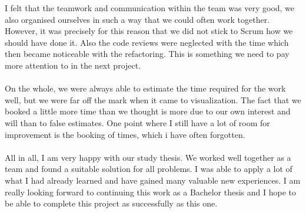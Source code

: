 I felt that the teamwork and communication within the team was very good, we also organised ourselves in such a way that we could often work together. However, it was precisely for this reason that we did not stick to Scrum how we should have done it. Also the code reviews were neglected with the time which then became noticeable with the refactoring. This is something we need to pay more attention to in the next project.
\\\\
On the whole, we were always able to estimate the time required for the work well, but we were far off the mark when it came to visualization. The fact that we booked a little more time than we thought is more due to our own interest and will than to false estimates. One point where I still have a lot of room for improvement is the booking of times, which i have often forgotten.
\\\\
All in all, I am very happy with our study thesis. We worked well together as a team and found a suitable solution for all problems. I was able to apply a lot of what I had already learned and have gained many valuable new experiences. I am really looking forward to continuing this work as a Bachelor thesis and I hope to be able to complete this project as successfully as this one.
